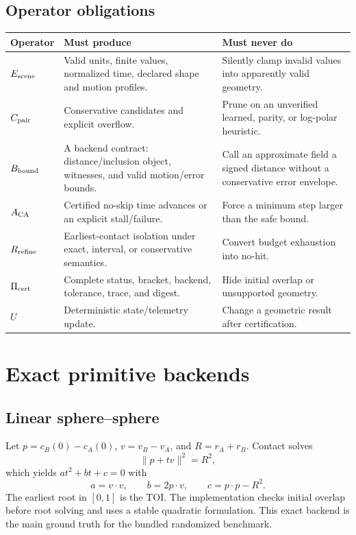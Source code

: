 \documentclass[11pt,a4paper,openany]{book}
\begin{document}
\section{Operator obligations}
\begin{tabularx}{\textwidth}{@{}L{0.16\textwidth}Y Y@{}}
\toprule
Operator & Must produce & Must never do \\
\midrule
$E_{\rm scene}$ & Valid units, finite values, normalized time, declared shape and motion profiles. & Silently clamp invalid values into apparently valid geometry. \\
$C_{\rm pair}$ & Conservative candidates and explicit overflow. & Prune on an unverified learned, parity, or log-polar heuristic. \\
$B_{\rm bound}$ & A backend contract: distance/inclusion object, witnesses, and valid motion/error bounds. & Call an approximate field a signed distance without a conservative error envelope. \\
$A_{\rm CA}$ & Certified no-skip time advances or an explicit stall/failure. & Force a minimum step larger than the safe bound. \\
$R_{\rm refine}$ & Earliest-contact isolation under exact, interval, or conservative semantics. & Convert budget exhaustion into no-hit. \\
$\Pi_{\rm cert}$ & Complete status, bracket, backend, tolerance, trace, and digest. & Hide initial overlap or unsupported geometry. \\
$U$ & Deterministic state/telemetry update. & Change a geometric result after certification. \\
\bottomrule
\end{tabularx}

\chapter{Exact primitive backends}
\section{Linear sphere--sphere}
Let $p=c_B(0)-c_A(0)$, $v=v_B-v_A$, and $R=r_A+r_B$. Contact solves
\begin{equation}
  \|p+tv\|^2=R^2,
\end{equation}
which yields $at^2+bt+c=0$ with
\begin{equation}
  a=v\cdot v,\qquad b=2p\cdot v,\qquad c=p\cdot p-R^2.
\end{equation}
The earliest root in $[0,1]$ is the TOI. The implementation checks initial overlap before root solving and uses a stable quadratic formulation. This exact backend is the main ground truth for the bundled randomized benchmark.
\end{document}
